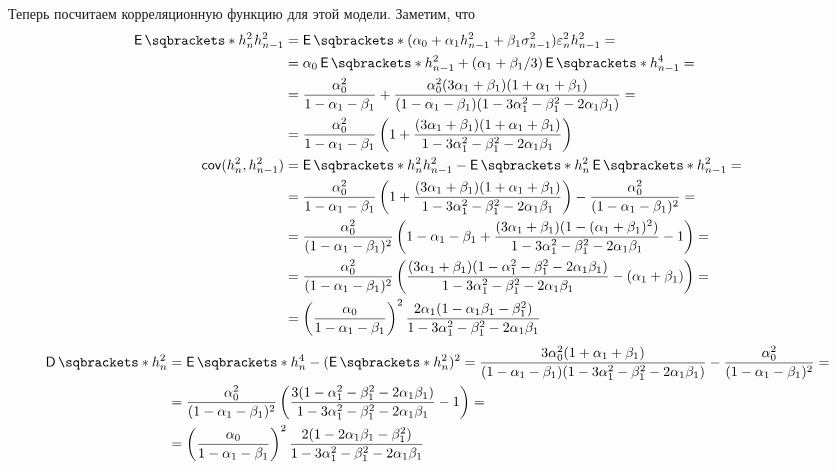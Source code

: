 Теперь посчитаем корреляционную функцию для этой модели. Заметим, что
\begin{align*}
	\E{h_{n}^{2}h_{n - 1}^{2}} &= \E{(\alpha_{0} + \alpha_{1}h_{n - 1}^{2} + 
	\beta_{1}\sigma_{n - 1}^{2})\epsilon_{n}^{2}h_{n - 1}^{2}} = \\
	&= \alpha_{0}\E{h_{n - 1}^{2}} + (\alpha_{1} + \beta_{1}/3)\E{h_{n - 
	1}^{4}} = \\
	&= \frac{\alpha_{0}^{2}}{1 - \alpha_{1} - \beta_{1}} + 
	\frac{\alpha_{0}^{2}(3\alpha_{1} + \beta_{1})(1 + \alpha_{1} + 
	\beta_{1})}{(1 - \alpha_{1} - \beta_{1})(1 - 3\alpha_{1}^{2} - 
	\beta_{1}^{2} - 2\alpha_{1}\beta_{1})} = \\
	&= \frac{\alpha_{0}^{2}}{1 - \alpha_{1} - \beta_{1}}\left(1 + 
	\frac{(3\alpha_{1} + \beta_{1})(1 + \alpha_{1} + \beta_{1})}{1 - 
	3\alpha_{1}^{2} - \beta_{1}^{2} - 2\alpha_{1}\beta_{1}}\right) \\
	\cov(h_{n}^{2}, h_{n - 1}^{2}) &= \E{h_{n}^{2}h_{n - 1}^{2}} - 
	\E{h_{n}^{2}}\E{h_{n - 1}^{2}} = \\
	&= \frac{\alpha_{0}^{2}}{1 - \alpha_{1} - \beta_{1}}\left(1 + 
	\frac{(3\alpha_{1} + \beta_{1})(1 + \alpha_{1} + \beta_{1})}{1 - 
	3\alpha_{1}^{2} - \beta_{1}^{2} - 2\alpha_{1}\beta_{1}}\right) - 
	\frac{\alpha_{0}^{2}}{(1 - \alpha_{1} - \beta_{1})^{2}} = \\
	&= \frac{\alpha_{0}^{2}}{(1 - \alpha_{1} - \beta_{1})^{2}}\left(1 - 
	\alpha_{1} - \beta_{1} + \frac{(3\alpha_{1} + \beta_{1})(1 - (\alpha_{1} + 
	\beta_{1})^{2})}{1 - 3\alpha_{1}^{2} - \beta_{1}^{2} - 
	2\alpha_{1}\beta_{1}} - 1\right) = \\
	&= \frac{\alpha_{0}^{2}}{(1 - \alpha_{1} - 
	\beta_{1})^{2}}\left(\frac{(3\alpha_{1} + \beta_{1})(1 - \alpha_{1}^{2} - 
	\beta_{1}^{2} - 2\alpha_{1}\beta_{1})}{1 - 3\alpha_{1}^{2} - \beta_{1}^{2} 
	- 2\alpha_{1}\beta_{1}} - (\alpha_{1} + \beta_{1})\right) = \\
	&= \left(\frac{\alpha_{0}}{1 - \alpha_{1} - 
	\beta_{1}}\right)^{2}\frac{2\alpha_{1}(1 - \alpha_{1}\beta_{1} - 
	\beta_{1}^{2})}{1 - 3\alpha_{1}^{2} - \beta_{1}^{2} - 2\alpha_{1}\beta_{1}}
\end{align*} 
\begin{align*}
	\D{h_{n}^{2}} &= \E{h_{n}^{4}} - (\E{h_{n}^{2}})^{2} = 
	\frac{3\alpha_{0}^{2}(1 + \alpha_{1} + \beta_{1})}{(1 - \alpha_{1} - 
	\beta_{1})(1 - 3\alpha_{1}^{2} - \beta_{1}^{2} - 2\alpha_{1}\beta_{1})} - 
	\frac{\alpha_{0}^{2}}{(1 - \alpha_{1} - \beta_{1})^{2}} = \\
	&= \frac{\alpha_{0}^{2}}{(1 - \alpha_{1} - \beta_{1})^{2}}\left(\frac{3(1 - 
	\alpha_{1}^{2} - \beta_{1}^{2} - 2\alpha_{1}\beta_{1})}{1 - 3\alpha_{1}^{2} 
	- \beta_{1}^{2} - 2\alpha_{1}\beta_{1}} - 1\right) = \\
	&= \left(\frac{\alpha_{0}}{1 - \alpha_{1} - \beta_{1}}\right)^{2}\frac{2(1 
	- 2\alpha_{1}\beta_{1} - \beta_{1}^{2})}{1 - 3\alpha_{1}^{2} - 
	\beta_{1}^{2} - 2\alpha_{1}\beta_{1}}
\end{align*}

